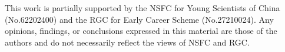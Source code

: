 \documentclass[sigconf]{acmart}
\begin{document}

\maketitle


% 


% 



% 

% 


% 



\begin{acks}
This work is partially supported by the NSFC for Young Scientists of China (No.62202400) and the RGC for Early Career Scheme (No.27210024). Any opinions, findings, or conclusions expressed in this material are those of the authors and do not necessarily reflect the views of NSFC and RGC.
\end{acks}



\balance


% 
% 
\newpage
\twocolumn


% 
\end{document}
